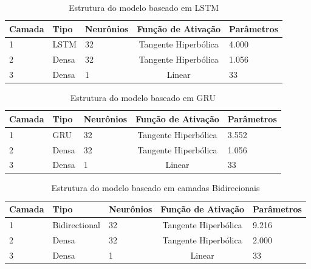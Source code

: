 \begin{table}[h!] \label{tabela:lstm_struct}
    \caption{Estrutura do modelo baseado em LSTM}
    \begin{tabularx}{\textwidth}{X|X|X|c|X} \hline
    Camada & Tipo & Neurônios & Função de Ativação & Parâmetros \\ \hline
    1 & LSTM                    & 32 & Tangente Hiperbólica                           & 4.000                  \\ \hline
    2 & Densa                   & 32 & Tangente Hiperbólica                            & 1.056                    \\ \hline
    3 & Densa                   & 1  & Linear                           & 33                     \\ \hline
    \end{tabularx}
\end{table}

\begin{table}[h!] \label{tabela:gru_struct}
    \caption{Estrutura do modelo baseado em GRU}
    \begin{tabularx}{\textwidth}{X|X|X|c|X} \hline
    Camada & Tipo & Neurônios & Função de Ativação & Parâmetros \\ \hline
    1      & GRU  & 32  & Tangente Hiperbólica     & 3.552                 \\ \hline
    2      & Densa & 32 & Tangente Hiperbólica     & 1.056                    \\ \hline
    3      & Densa & 1  & Linear                   & 33                     \\ \hline
    \end{tabularx}
\end{table}

\begin{table}[h!] \label{tabela:bidirectional_struct}
    \caption{Estrutura do modelo baseado em camadas Bidirecionais}
    \begin{tabularx}{\textwidth}{X|X|X|c|X} \hline
    Camada & Tipo & Neurônios & Função de Ativação & Parâmetros \\ \hline
    1                   & Bidirectional            & 32                   & Tangente Hiperbólica                         & 9.216                \\ \hline
    2                   & Densa                   &  32               & Tangente Hiperbólica                           & 2.000                 \\ \hline
    3                   & Densa                   &  1                   & Linear                       & 33                     \\ \hline
    \end{tabularx}
\end{table}
    





